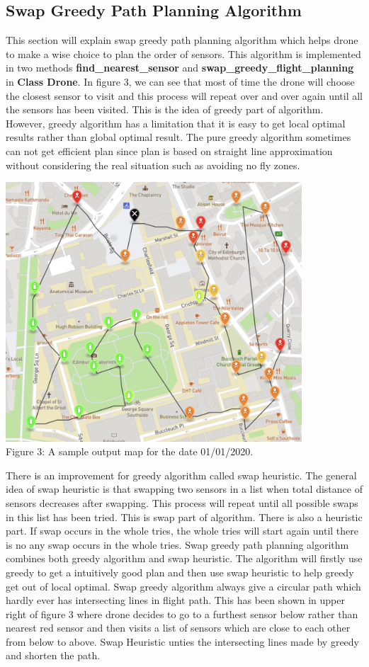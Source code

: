 \documentclass[12pt]{article}
\begin{document}
\subsection {Swap Greedy Path Planning Algorithm}

This section will explain swap greedy path planning algorithm which helps drone to make a wise choice to plan the order of sensors. This algorithm is implemented in two methods \textbf{find\_nearest\_sensor} and \textbf{swap\_greedy\_flight\_planning} in \textbf{Class Drone}. In figure 3, we can see that most of time the drone will choose the closest sensor to visit and this process will repeat over and over again until all the sensors has been visited. This is the idea of greedy part of algorithm. However, greedy algorithm has a limitation that it is easy to get local optimal results rather than global optimal result. The pure greedy algorithm sometimes can not get efficient plan since plan is based on straight line approximation without considering the real situation such as avoiding no fly zones. 
\begin{center}
\includegraphics[width=0.83\textwidth]{2020-01-01.png}\\
\caption{Figure 3: A sample output map for the date 01/01/2020.}
\end{center}
There is an improvement for greedy algorithm called swap heuristic. The general idea of swap heuristic is that swapping two sensors in a list when total distance of sensors decreases after swapping. This process will repeat until all possible swaps in this list has been tried. This is swap part of algorithm. There is also a heuristic part. If swap occurs in the whole tries, the whole tries will start again until there is no any swap occurs in the whole tries. Swap greedy path planning algorithm combines both greedy algorithm and swap heuristic. The algorithm will firstly use greedy to get a intuitively good plan and then use swap heuristic to help greedy get out of local optimal. Swap greedy algorithm always give a circular path which hardly ever has intersecting lines in flight path. This has been shown in upper right of figure 3 where drone decides to go to a furthest sensor below rather than nearest red sensor and then visits a list of sensors which are close to each other from below to above. Swap Heuristic unties the intersecting lines made by greedy and shorten the path.
\end{document}
